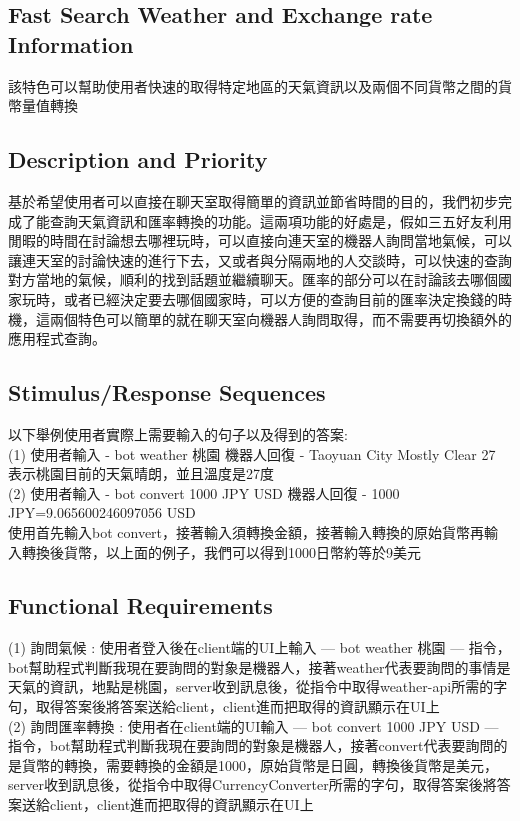 \documentclass{scrreprt}
\begin{document}
\begin{CJK}{UTF8}{bkai}
\section{Fast Search Weather and Exchange rate Information}
該特色可以幫助使用者快速的取得特定地區的天氣資訊以及兩個不同貨幣之間的貨幣量值轉換

\subsection{Description and Priority}
基於希望使用者可以直接在聊天室取得簡單的資訊並節省時間的目的，我們初步完成了能查詢天氣資訊和匯率轉換的功能。這兩項功能的好處是，假如三五好友利用閒暇的時間在討論想去哪裡玩時，可以直接向連天室的機器人詢問當地氣候，可以讓連天室的討論快速的進行下去，又或者與分隔兩地的人交談時，可以快速的查詢對方當地的氣候，順利的找到話題並繼續聊天。匯率的部分可以在討論該去哪個國家玩時，或者已經決定要去哪個國家時，可以方便的查詢目前的匯率決定換錢的時機，這兩個特色可以簡單的就在聊天室向機器人詢問取得，而不需要再切換額外的應用程式查詢。

\subsection{Stimulus/Response Sequences}
以下舉例使用者實際上需要輸入的句子以及得到的答案: \\
(1) 使用者輸入 - bot weather 桃園 	機器人回復 - Taoyuan City Mostly Clear 27\\
表示桃園目前的天氣晴朗，並且溫度是27度\\
(2) 使用者輸入 - bot convert 1000 JPY USD 		機器人回復 - 1000 JPY=9.065600246097056 USD\\
使用首先輸入bot convert，接著輸入須轉換金額，接著輸入轉換的原始貨幣再輸入轉換後貨幣，以上面的例子，我們可以得到1000日幣約等於9美元\\

\subsection{Functional Requirements}
(1) 詢問氣候 : 使用者登入後在client端的UI上輸入 --- bot weather 桃園 --- 指令，bot幫助程式判斷我現在要詢問的對象是機器人，接著weather代表要詢問的事情是天氣的資訊，地點是桃園，server收到訊息後，從指令中取得weather-api所需的字句，取得答案後將答案送給client，client進而把取得的資訊顯示在UI上\\
(2) 詢問匯率轉換 : 使用者在client端的UI輸入 ---  bot convert 1000 JPY USD --- 指令，bot幫助程式判斷我現在要詢問的對象是機器人，接著convert代表要詢問的是貨幣的轉換，需要轉換的金額是1000，原始貨幣是日圓，轉換後貨幣是美元，server收到訊息後，從指令中取得CurrencyConverter所需的字句，取得答案後將答案送給client，client進而把取得的資訊顯示在UI上\\




\end{CJK}
\end{document}

